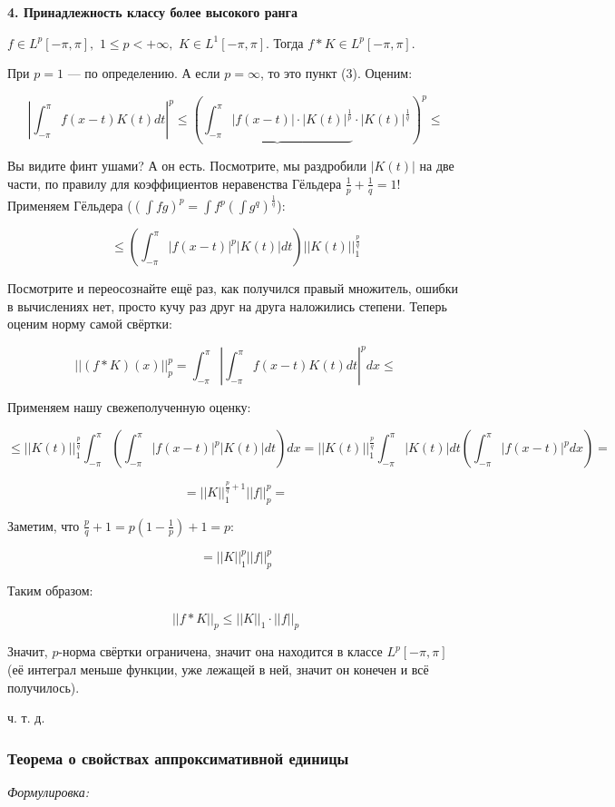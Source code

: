 \documentclass{article}
\def\dbl{\,\,}
\begin{document}
\textbf{4. Принадлежность классу более высокого ранга}

$f \in L^p[-\pi, \pi], \dbl 1 \le p < +\infty, \dbl K \in L^1[-\pi, \pi]$. Тогда $f * K \in L^p[-\pi, \pi]$.

При $p = 1$ --- по определению. А если $p = \infty$, то это пункт (3). Оценим:

\[\left|\int_{-\pi}^{\pi}f(x - t)K(t)dt\right|^p \le \left( \underbrace{\int_{-\pi}^{\pi} |f(x - t)| \cdot |K(t)|^{\frac{1}{p}}} \cdot |K(t)|^{\frac{1}{q}}\right)^p \le \]

Вы видите финт ушами? А он есть. Посмотрите, мы раздробили $|K(t)|$ на две части, по правилу для коэффициентов неравенства Гёльдера $\frac{1}{p} + \frac{1}{q} = 1$! Применяем Гёльдера ($(\int fg)^p = \int f^p (\int g^q)^{\frac{1}{q}}$):

\[\le \left( \int_{-\pi}^{\pi} |f(x - t)|^p|K(t)| dt\right)||K(t)||_1^{\frac{p}{q}}\]

Посмотрите и переосознайте ещё раз, как получился правый множитель, ошибки в вычислениях нет, просто кучу раз друг на друга наложились степени. Теперь оценим норму самой свёртки:

\[||(f * K)(x)||_p^p = \int_{-\pi}^{\pi} \left|\int_{-\pi}^{\pi}f(x - t)K(t)dt \right|^pdx \le\]

Применяем нашу свежеполученную оценку:

\[\le ||K(t)||_1^{\frac{p}{q}}\int_{-\pi}^{\pi} \left( \int_{-\pi}^{\pi} |f(x - t)|^p|K(t)| dt\right) dx = ||K(t)||_1^{\frac{p}{q}}\int_{-\pi}^{\pi}|K(t)| dt \left( \int_{-\pi}^{\pi} |f(x - t)|^p dx\right) =\]

\[= ||K||_1^{\frac{p}{q} + 1}||f||_p^p =\]

Заметим, что $\frac{p}{q} + 1 = p\left(1 - \frac{1}{p}\right) + 1= p$:

\[=||K||_1^p||f||_p^p\]

Таким образом:

\[||f * K||_p \le ||K||_1 \cdot ||f||_p \]

Значит, $p$-норма свёртки ограничена, значит она находится в классе $L^p[-\pi, \pi]$ (её интеграл меньше функции, уже лежащей в ней, значит он конечен и всё получилось).

ч. т. д. 

\subsubsection{Теорема о свойствах аппроксимативной единицы}
\textit{Формулировка:}
\end{document}

